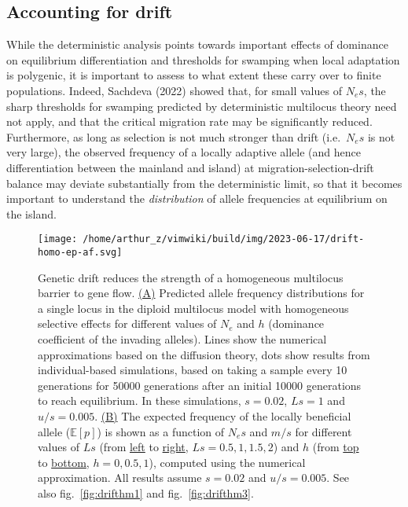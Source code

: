 \documentclass[
  11pt,
]{article}
\begin{document}
\hypertarget{accounting-for-drift}{%
\subsection{Accounting for drift}\label{accounting-for-drift}}

While the deterministic analysis points towards important effects of
dominance on equilibrium differentiation and thresholds for swamping
when local adaptation is polygenic, it is important to assess to what
extent these carry over to finite populations. Indeed, Sachdeva (2022)
showed that, for small values of \(N_es\), the sharp thresholds for
swamping predicted by deterministic multilocus theory need not apply,
and that the critical migration rate may be significantly reduced.
Furthermore, as long as selection is not much stronger than drift
(i.e.~\(N_es\) is not very large), the observed frequency of a locally
adaptive allele (and hence differentiation between the mainland and
island) at migration-selection-drift balance may deviate substantially
from the deterministic limit, so that it becomes important to understand
the \emph{distribution} of allele frequencies at equilibrium on the
island.

\begin{figure}
\hypertarget{fig:drifthm}{%
\centering
\texttt{[image: /home/arthur\_z/vimwiki/build/img/2023-06-17/drift-homo-ep-af.svg]}
\caption{Genetic drift reduces the strength of a homogeneous multilocus
barrier to gene flow. \uline{(A)} Predicted allele frequency
distributions for a single locus in the diploid multilocus model with
homogeneous selective effects for different values of \(N_e\) and \(h\)
(dominance coefficient of the invading alleles). Lines show the
numerical approximations based on the diffusion theory, dots show
results from individual-based simulations, based on taking a sample
every 10 generations for 50000 generations after an initial 10000
generations to reach equilibrium. In these simulations, \(s = 0.02\),
\(Ls = 1\) and \(u/s = 0.005\). \uline{(B)} The expected frequency of
the locally beneficial allele (\(\mathbb{E}[p]\)) is shown as a function
of \(N_es\) and \(m/s\) for different values of \(Ls\) (from
\uline{left} to \uline{right}, \(Ls = 0.5, 1, 1.5, 2\)) and \(h\) (from
\uline{top} to \uline{bottom}, \(h=0, 0.5, 1\)), computed using the
numerical approximation. All results assume \(s=0.02\) and
\(u/s=0.005\). See also fig.~\ref{fig:drifthm1} and
fig.~\ref{fig:drifthm3}.}\label{fig:drifthm}
}
\end{figure}
\end{document}
